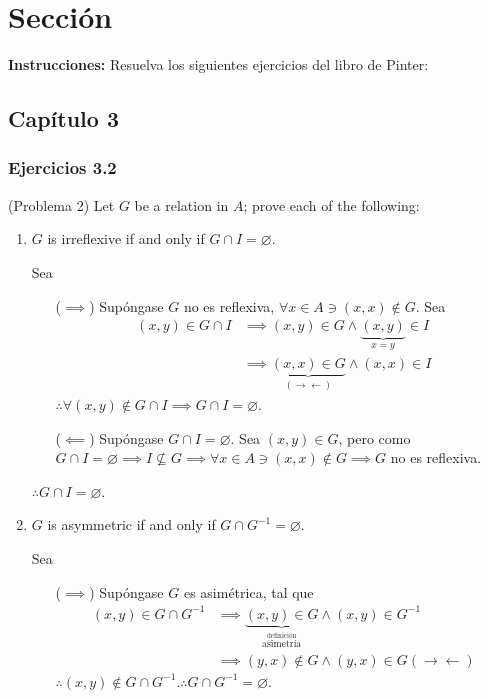 \section{Sección}
\textbf{Instrucciones: }  Resuelva los siguientes ejercicios del libro de Pinter:

\subsection{Capítulo 3}
\subsubsection{Ejercicios 3.2}
\begin{problema}(Problema 2)
	Let $G$ be a relation in $A$; prove each of the following:
	\begin{enumerate}
		\item $G$ is irreflexive if and only if $G \cap I=\varnothing$.
		\begin{dem}
			Sea
			\begin{enumerate}
				\item[($\implies$)] Supóngase $G$ no es reflexiva, $\forall x\in A \ni (x,x)\not\in G$. Sea 
				\begin{align*}
					(x,y)\in G\cap I &\implies (x,y)\in G\wedge \underbrace{(x,y)}_{x=y}\in I \\
					&\implies \underbrace{(x,x)\in G}_{(\to\gets)} \wedge (x,x)\in I
				\end{align*}
				$\therefore \forall (x,y)\not\in G\cap I\implies  G\cap I = \varnothing$.
				\item[($\impliedby$)] Supóngase $G\cap I=\varnothing$. Sea 
				$(x,y)\in G$, pero como $G\cap I=\varnothing\implies I\not\subseteq G\implies \forall x\in A\ni (x,x)\not\in G\implies G$ no es reflexiva.  
			\end{enumerate}
		$\therefore G \cap I=\varnothing$.
		\end{dem}
		\item $G$ is asymmetric if and only if $G \cap G^{-1}=\varnothing$.
		\begin{dem}
			Sea
			\begin{enumerate}
				\item[($\implies$)] Supóngase $G$ es asimétrica, tal que 
				\begin{align*}
					(x,y)\in G\cap G^{-1} &\implies \underbrace{(x,y)\in G}_{\stackrel{\text{definición}}{\text{asimetría}}}\wedge (x,y)\in G^{-1}\\
					&\implies (y,x)\not\in G \wedge (y,x)\in G (\to\gets ) 
				\end{align*}
			$\therefore (x,y)\not\in G\cap G^{-1}. \therefore G\cap G^{-1}=\varnothing$. 
				

\end{enumerate}
\end{dem}
\end{enumerate}
\end{problema}
